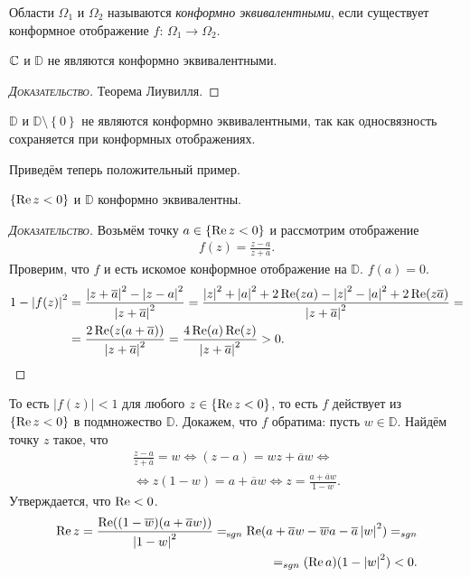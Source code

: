 \documentclass[../complex-analysis.tex]{subfiles}
\begin{document}
\begin{df}
 Области $ \Omega_1 $ и $ \Omega_2 $ называются \textit{конформно эквивалентными}, если существует конформное отображение $ f \colon\, \Omega_1 \to \Omega_2 $.
\end{df}

\begin{exmpl}
 $ \mathbb{C} $ и $ \mathbb D $ не являются конформно эквивалентными.
\end{exmpl}
\begin{proof}[\normalfont\textsc{Доказательство}]
 Теорема Лиувилля.
\end{proof}
\begin{exmpl}
 $ \mathbb D $ и $ \mathbb D \setminus \left\{ 0 \right\} $ не являются конформно эквивалентными, так как односвязность сохраняется при конформных отображениях.
\end{exmpl}
Приведём теперь положительный пример.
\begin{exmpl}
 $ \left\{ \operatorname{Re} z < 0 \right\} $ и $ \mathbb D $ конформно эквивалентны.
\end{exmpl}
\begin{proof}[\normalfont\textsc{Доказательство}]
 Возьмём точку $ a \in \left\{ \operatorname{Re} z < 0 \right\} $ и рассмотрим отображение
 \begin{align*}
  f(z) = \frac{z-a}{z+\overline a}.
 \end{align*} Проверим, что $ f $ и есть искомое конформное отображение на $ \mathbb D $. $ f(a) = 0 $.
 \begin{align*}
  1 - \left| f(z) \right|^{2} &= \frac{\left| z+\overline a \right|^{2} - \left| z-a \right|^{2}}{\left| z+\overline a \right|^{2}} = \frac{\left| z \right|^{2} + \left| a \right|^{2} + 2 \operatorname{Re}(za) -\left| z \right|^{2} - \left| a \right|^{2} + 2 \operatorname{Re}(z \overline a)}{\left| z+\overline a \right|^{2}} = \\
  &= \frac{2 \operatorname{Re}(z(a+\overline a))}{\left| z+\overline a \right|^{2}} = \frac{4\operatorname{Re}(a)\operatorname{Re}(z)}{\left| z+\overline a \right|^{2}} > 0.
 \end{align*}
\end{proof} То есть $ \left| f(z) \right|< 1 $ для любого $ z \in \left\{ \operatorname{Re} z < 0 \right\}$, то есть $ f $ действует из $ \left\{ \operatorname{Re} z < 0 \right\} $ в подмножество $ \mathbb D $. Докажем, что $ f $ обратима: пусть $ w \in \mathbb D $. Найдём точку $ z $ такое, что
\begin{align*}
 \frac{z-a}{z+\overline a} = w \iff (z-a) = wz + \overline a w \iff \\ \iff z(1-w) = a + \overline a w \iff z = \frac{a + \overline a w}{1 - w}.
\end{align*} Утверждается, что $ \operatorname{Re}  < 0 $.
\begin{align*}
 \operatorname{Re} z = \frac{\operatorname{Re}((1 - \overline w)(a + \overline a w))}{\left| 1-w \right|^{2}} =_{\mathrm sgn} \operatorname{Re}(a + \overline a w - \overline w a - \overline a \left| w \right|^{2}) =_{sgn} \\
 =_{sgn} (\operatorname{Re} a)(1 - \left| w \right|^{2}) < 0.
\end{align*}
\end{document}
